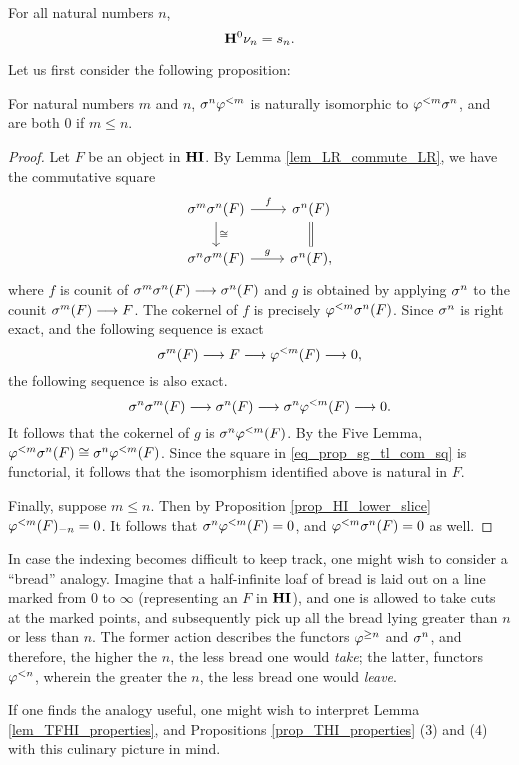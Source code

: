 \begin{cor}\label{cor_H_commute_with_slice}
For all natural numbers $n$,
\[
\HH^0 \sliceDM{n} = \slice{n}.
\]
\end{cor}

Let us first consider the following proposition:

\begin{prop}\label{prop_sg_tl_commute}
For natural numbers $m$ and $n$, $\sgHI{n} \tlHI{m}$ is naturally
isomorphic to $\tlHI{m} \sgHI{n}$, and are both 0 if $m \leq n$.
\end{prop}
\begin{proof}
Let $F$ be an object in $\HI$. By Lemma \ref{lem_LR_commute_LR}, 
we have the commutative square
\begin{equation}\label{eq_prop_sg_tl_com_sq}
\begin{tikzcd}
\sgHI{m}\sgHI{n}(F) \arrow{r}{f} \arrow{d}{\cong} & 
\sgHI{n}(F) \arrow[equal]{d} \\
\sgHI{n}\sgHI{m}(F) \arrow{r}{g} &
\sgHI{n}(F),
\end{tikzcd}
\end{equation}
where $f$ is counit of $\sgHI{m}\sgHI{n}(F) \to \sgHI{n}(F)$ and 
$g$ is obtained by applying $\sgHI{n}$ to the counit $\sgHI{m}(F) 
\to F$. The cokernel of $f$ is precisely $\tlHI{m} \sgHI{n}(F)$.
Since $\sgHI{n}$ is right exact, and the
following sequence is exact
\[
\sgHI{m}(F) \to F \to \tlHI{m}(F) \to 0,
\]
the following sequence is also exact.
\[
\sgHI{n} \sgHI{m}(F) \to \sgHI{n}(F) \to \sgHI{n} \tlHI{m}(F) 
   \to 0.
\]
It follows that the cokernel of $g$ is $\sgHI{n} \tlHI{m}(F)$. 
By the Five Lemma, $\tlHI{m} \sgHI{n}(F) \cong \sgHI{n} 
\tlHI{m}(F)$. Since the square in \eqref{eq_prop_sg_tl_com_sq} is 
functorial, it follows that the isomorphism identified above is
natural in $F$.

Finally, suppose $m \leq n$. Then by Proposition 
\ref{prop_HI_lower_slice} $\RHI[n]{\tlHI{m}(F)} = 0$. It follows 
that $\sgHI{n} \tlHI{m}(F) = 0$, and $\tlHI{m} \sgHI{n}(F) = 0$ as 
well.
\end{proof}

\begin{rmk}
In case the indexing becomes difficult to keep track, one might
wish to consider a ``bread'' analogy. Imagine that a half-infinite 
loaf of bread is laid out on a line marked from 0 to $\infty$ 
(representing an $F$ in $\HI$), and one is allowed to take cuts at 
the marked points, and subsequently pick up all the bread lying 
greater than $n$ or less than $n$. The former action describes the 
functors $\tgHI{n}$ and $\sgHI{n}$, and therefore, the higher the 
$n$, the less bread one would \emph{take}; the latter, functors 
$\tlHI{n}$, wherein the greater the $n$, the less bread one 
would \emph{leave}.

If one finds the analogy useful, one might wish to interpret
Lemma \ref{lem_TFHI_properties}, and Propositions
\ref{prop_THI_properties} (3) and (4) with this culinary picture 
in mind.
\end{rmk}

